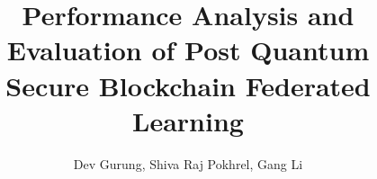 \documentclass[5p,times]{elsarticle}
\theoremstyle{definition}
\theoremstyle{remark}
\numberwithin{equation}{section}
\begin{document}
\begin{frontmatter}



\title{Performance Analysis and Evaluation of Post Quantum Secure Blockchain Federated
Learning}


\author{Dev Gurung, Shiva Raj Pokhrel, Gang Li}





\end{frontmatter}
\end{document}
